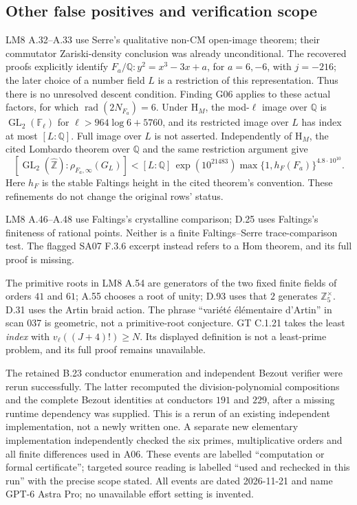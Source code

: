\subsection{Other false positives and verification scope}

LM8 A.32--A.33 use Serre's qualitative non-CM open-image theorem;
their commutator Zariski-density conclusion was already unconditional.
The recovered proofs explicitly identify
$F_a/\mathbb Q:y^2=x^3-3x+a$, for $a=6,-6$, with $j=-216$;
the later choice of a number field $L$ is a restriction of this
representation. Thus there is no unresolved descent condition.
Finding G06 applies to these actual factors, for which
$\operatorname{rad}(2N_{F_a})=6$. Under $\mathrm H_M$, the mod-$\ell$
image over $\mathbb Q$ is $\operatorname{GL}_2(\mathbb F_\ell)$ for
$\ell>964\log6+5760$, and its restricted image over $L$ has index
at most $[L:\mathbb Q]$. Full image over $L$ is not asserted.
Independently of $\mathrm H_M$, the cited Lombardo theorem over
$\mathbb Q$ and the same restriction argument give
\[
 [\operatorname{GL}_2(\widehat{\mathbb Z}):\rho_{F_a,\infty}(G_L)]
 <[L:\mathbb Q]\,\exp(10^{21483})
       \max\{1,h_F(F_a)\}^{4.8\cdot10^{10}}.
\]
Here $h_F$ is the stable Faltings height in the cited theorem's
convention. These refinements do not change the original rows' status.

LM8 A.46--A.48 use Faltings's crystalline comparison; D.25 uses
Faltings's finiteness of rational points. Neither is a finite
Faltings--Serre trace-comparison test. The flagged SA07 F.3.6 excerpt
instead refers to a Hom theorem, and its full proof is missing.

The primitive roots in LM8 A.54 are generators of the two fixed
finite fields of orders $41$ and $61$; A.55 chooses a root of unity;
D.93 uses that $2$ generates $\mathbb Z_5^\times$. D.31 uses the
Artin braid action. The phrase ``vari\'et\'e \'el\'ementaire d'Artin''
in scan 037 is geometric, not a primitive-root conjecture.
GT C.1.21 takes the least \emph{index} with
$v_\ell((J+4)!)\ge N$. Its displayed definition is not a least-prime
problem, and its full proof remains unavailable.

The retained B.23 conductor enumeration and independent Bezout verifier
were rerun successfully. The latter recomputed the division-polynomial
compositions and the complete Bezout identities at conductors $191$
and $229$, after a missing runtime dependency was supplied. This is a
rerun of an existing independent implementation, not a newly written
one. A separate new elementary implementation independently checked
the six primes, multiplicative orders and all finite differences used
in A06. These events are labelled ``computation or formal certificate'';
targeted source reading is labelled ``used and rechecked in this run''
with the precise scope stated. All events are dated 2026-11-21 and name
GPT-6 Astra Pro; no unavailable effort setting is invented.

